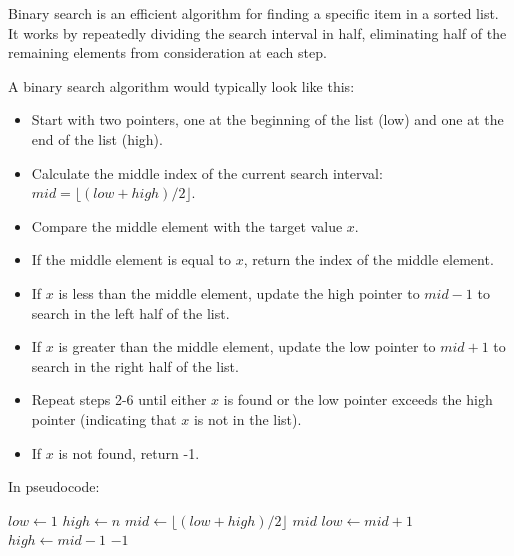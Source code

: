 \begin{definition}
    Binary search is an efficient algorithm for finding a specific item in a sorted list. It works by repeatedly dividing the search interval in half, eliminating half of the remaining elements from consideration at each step.
\end{definition}
\begin{eg}
    A binary search algorithm would typically look like this:
    \begin{itemize}[itemsep=1pt,label=$\circ$]
        \item Start with two pointers, one at the beginning of the list (low) and one at the end of the list (high).
        \item Calculate the middle index of the current search interval: $mid = \lfloor (low + high) / 2 \rfloor$.
        \item Compare the middle element with the target value $x$.
        \item If the middle element is equal to $x$, return the index of the middle element.
        \item If $x$ is less than the middle element, update the high pointer to $mid - 1$ to search in the left half of the list.
        \item If $x$ is greater than the middle element, update the low pointer to $mid + 1$ to search in the right half of the list.
        \item Repeat steps 2-6 until either $x$ is found or the low pointer exceeds the high pointer (indicating that $x$ is not in the list).
        \item If $x$ is not found, return -1.
    \end{itemize}
    In pseudocode:
    \begin{algorithmic}
            \State $low \gets 1$
            \State $high \gets n$
                \State $mid \gets \lfloor (low + high) / 2 \rfloor$ 
                    \State \Return $mid$
                    \State $low \gets mid + 1$
                \Else
                    \State $high \gets mid - 1$
                \EndIf
            \EndWhile
            \State \Return $-1$
        \EndFunction
    \end{algorithmic}
\end{eg}
